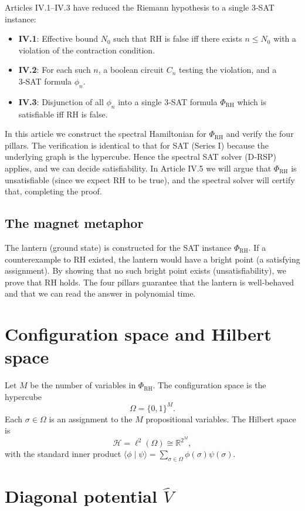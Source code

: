 \documentclass[11pt,a4paper]{article}
\begin{document}
Articles IV.1–IV.3 have reduced the Riemann hypothesis to a single 3‑SAT instance:
\begin{itemize}
\item \textbf{IV.1}: Effective bound \(N_0\) such that RH is false iff there exists \(n \le N_0\) with a violation of the contraction condition.
\item \textbf{IV.2}: For each such \(n\), a boolean circuit \(C_n\) testing the violation, and a 3‑SAT formula \(\phi_n\).
\item \textbf{IV.3}: Disjunction of all \(\phi_n\) into a single 3‑SAT formula \(\Phi_{\text{RH}}\) which is satisfiable iff RH is false.
\end{itemize}
In this article we construct the spectral Hamiltonian for \(\Phi_{\text{RH}}\) and verify the four pillars. The verification is identical to that for SAT (Series I) because the underlying graph is the hypercube. Hence the spectral SAT solver (D‑RSP) applies, and we can decide satisfiability. In Article IV.5 we will argue that \(\Phi_{\text{RH}}\) is unsatisfiable (since we expect RH to be true), and the spectral solver will certify that, completing the proof.

\subsection{The magnet metaphor}

The lantern (ground state) is constructed for the SAT instance \(\Phi_{\text{RH}}\). If a counterexample to RH existed, the lantern would have a bright point (a satisfying assignment). By showing that no such bright point exists (unsatisfiability), we prove that RH holds. The four pillars guarantee that the lantern is well‑behaved and that we can read the answer in polynomial time.

\section{Configuration space and Hilbert space}

Let \(M\) be the number of variables in \(\Phi_{\text{RH}}\). The configuration space is the hypercube
\[
\Omega = \{0,1\}^M.
\]
Each \(\sigma \in \Omega\) is an assignment to the \(M\) propositional variables. The Hilbert space is
\[
\mathcal{H} = \ell^2(\Omega) \cong \mathbb{R}^{2^M},
\]
with the standard inner product \(\langle \phi \mid \psi \rangle = \sum_{\sigma\in\Omega} \phi(\sigma)\psi(\sigma)\).

\section{Diagonal potential \(\hat{V}\)}
\end{document}
